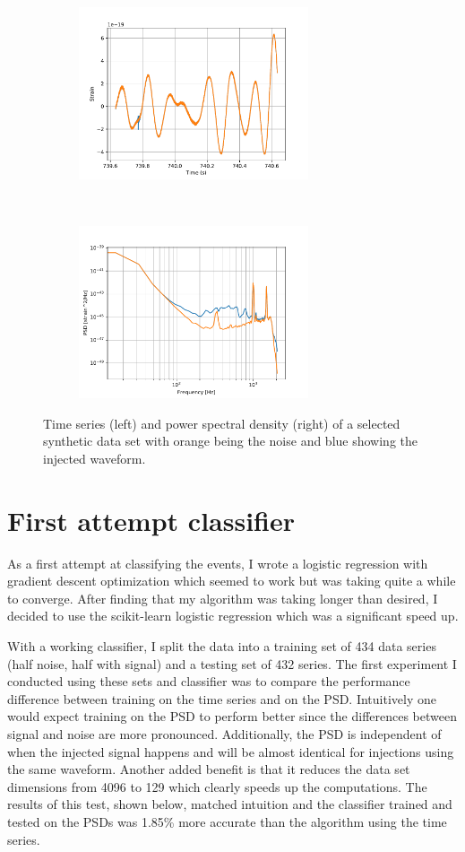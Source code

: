 \documentclass{article}
\begin{document}
\begin{figure}[h!]
    \centering
    \begin{subfigure}[t]{0.5\textwidth}
        \centering
        \includegraphics[height=2in]{TimeSeries.pdf}
    \end{subfigure}%
    ~ 
    \begin{subfigure}[t]{0.5\textwidth}
        \centering
        \includegraphics[height=2in]{PSD.pdf}
    \end{subfigure}
    \caption{Time series (left) and power spectral density (right) of a selected synthetic data set with orange being the noise and blue showing the injected waveform. }
\end{figure}

\section{First attempt classifier}
As a first attempt at classifying the events, I wrote a logistic regression with gradient descent optimization which seemed to work but was taking quite a while to converge. After finding that my algorithm was taking longer than desired, I decided to use the scikit-learn logistic regression which was a significant speed up. 

With a working classifier, I split the data into a training set of 434 data series (half noise, half with signal) and a testing set of 432 series. The first experiment I conducted using these sets and classifier was to compare the performance difference between training on the time series and on the PSD. Intuitively one would expect training on the PSD to perform better since the differences between signal and noise are more pronounced. Additionally, the PSD is independent of when the injected signal happens and will be almost identical for injections using the same waveform. Another added benefit is that it reduces the data set dimensions from 4096 to 129 which clearly speeds up the computations. The results of this test, shown below, matched intuition and the classifier trained and tested on the PSDs was 1.85\% more accurate than the algorithm using the time series.
\end{document}
